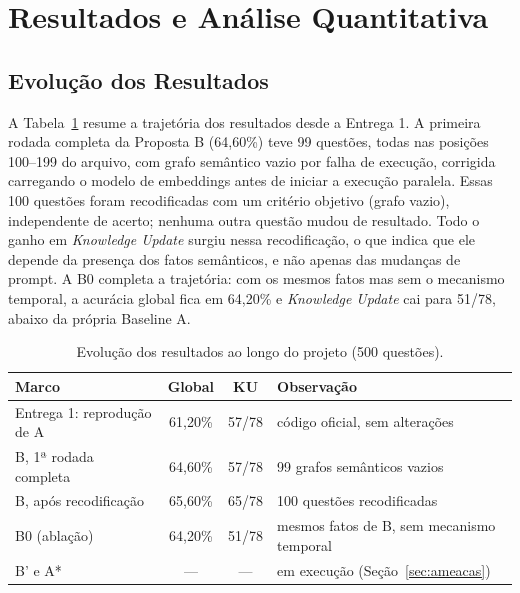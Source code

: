 \documentclass[10pt,conference,twocolumn]{IEEEtran}
\begin{document}
\section{Resultados e Análise Quantitativa}

\subsection{Evolução dos Resultados}
A Tabela~\ref{tab:evolucao} resume a trajetória dos resultados desde a Entrega 1. A primeira rodada completa da Proposta B (64,60\%) teve 99 questões, todas nas posições 100--199 do arquivo, com grafo semântico vazio por falha de execução, corrigida carregando o modelo de embeddings antes de iniciar a execução paralela. Essas 100 questões foram recodificadas com um critério objetivo (grafo vazio), independente de acerto; nenhuma outra questão mudou de resultado. Todo o ganho em \textit{Knowledge Update} surgiu nessa recodificação, o que indica que ele depende da presença dos fatos semânticos, e não apenas das mudanças de prompt. A B0 completa a trajetória: com os mesmos fatos mas sem o mecanismo temporal, a acurácia global fica em 64,20\% e \textit{Knowledge Update} cai para 51/78, abaixo da própria Baseline A.

\begin{table}[!t]
\caption{Evolução dos resultados ao longo do projeto (500 questões).}
\label{tab:evolucao}
\centering
\footnotesize
\setlength{\tabcolsep}{3.5pt}
\begin{tabular}{p{2.5cm}ccp{2.8cm}}
\toprule
\textbf{Marco} & \textbf{Global} & \textbf{KU} & \textbf{Observação} \\
\midrule
Entrega 1: reprodução de A & 61,20\% & 57/78 & código oficial, sem alterações \\
B, 1ª rodada completa & 64,60\% & 57/78 & 99 grafos semânticos vazios \\
B, após recodificação & 65,60\% & 65/78 & 100 questões recodificadas \\
B0 (ablação) & 64,20\% & 51/78 & mesmos fatos de B, sem mecanismo temporal \\
B' e A* & --- & --- & em execução (Seção~\ref{sec:ameacas}) \\
\bottomrule
\end{tabular}
\end{table}
\end{document}
